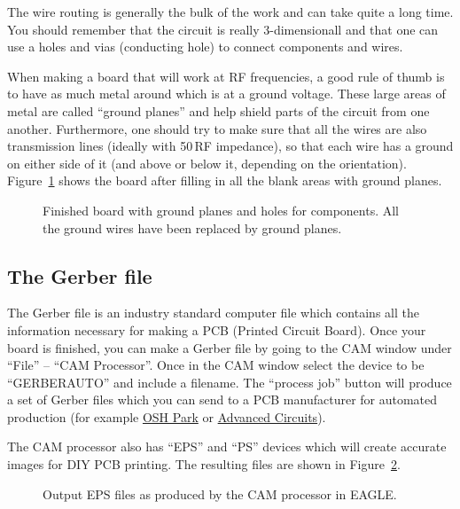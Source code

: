 \documentclass{article}
\begin{document}
The wire routing is generally the bulk of the work and can take quite a long time. You should remember that the circuit is really 3-dimensionall and that one can use a holes and vias (conducting hole) to connect components and wires.

When making a board that will work at RF frequencies, a good rule of thumb is to have as much metal around which is at a ground voltage. These large areas of metal are called ``ground planes'' and help shield parts of the circuit from one another. Furthermore, one should try to make sure that all the wires are also transmission lines (ideally with 50\,\Ohm RF impedance), so that each wire has a ground on either side of it (and above or below it, depending on the orientation).  Figure~\ref{fig:eagle:board_complete} shows the board after filling in all the blank areas with ground planes.

\begin{figure}
\begin{center}
\end{center}
\caption{Finished board with ground planes and holes for components. All the ground wires have been replaced by ground planes.}
\label{fig:eagle:board_complete}
\end{figure}

\subsection{The Gerber file}
The Gerber file is an industry standard computer file which contains all the information necessary for making a PCB (Printed Circuit Board). Once your board is finished, you can make a Gerber file by going to the CAM window under ``File'' -- ``CAM Processor''. Once in the CAM window select the device to be ``GERBERAUTO'' and include a filename. The ``process job'' button will produce a set of Gerber files which you can send to a PCB manufacturer for automated production (for example \href{http://oshpark.com/}{OSH Park} or \href{http://www.4pcb.com/}{Advanced Circuits}).

The CAM processor also has ``EPS'' and ``PS'' devices which will create accurate images for DIY PCB printing.  The resulting files are shown in Figure~\ref{fig:eagle:board_eps}.  

\begin{figure}
\begin{center}
 
\end{center}
\caption{Output EPS files as produced by the CAM processor in EAGLE.}
\label{fig:eagle:board_eps}
\end{figure}
\end{document}
